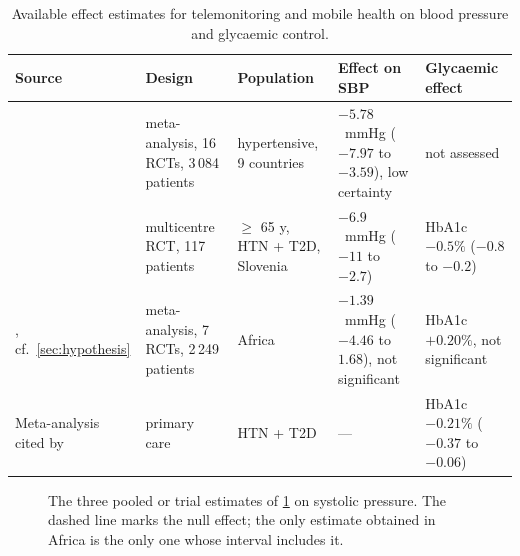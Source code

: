 \documentclass[12pt,a4paper,oneside]{report}
\begin{document}
\begin{table}[htbp]
\centering\footnotesize
\caption{Available effect estimates for telemonitoring and mobile health on blood pressure and glycaemic control.}\label{tab:effect-synthesis}
\begin{tabularx}{\textwidth}{@{}>{\raggedright\arraybackslash}p{2.3cm} >{\raggedright\arraybackslash}p{2.6cm} >{\raggedright\arraybackslash}p{2.4cm} >{\raggedright\arraybackslash}X >{\raggedright\arraybackslash}p{2.4cm}@{}}
\toprule
\textbf{Source} & \textbf{Design} & \textbf{Population} & \textbf{Effect on SBP} & \textbf{Glycaemic effect} \\
\midrule
\textcite{zhou2024} & meta-analysis, 16 RCTs, 3\,084 patients & hypertensive, 9 countries & $-5.78$~mmHg ($-7.97$ to $-3.59$), low certainty & not assessed \\
\textcite{mihevc2025} & multicentre RCT, 117 patients & $\geq$ 65 y, HTN + T2D, Slovenia & $-6.9$~mmHg ($-11$ to $-2.7$) & HbA1c $-0.5\%$ ($-0.8$ to $-0.2$) \\
\textcite{aovare2023}, cf.\ \cref{sec:hypothesis} & meta-analysis, 7 RCTs, 2\,249 patients & Africa & $-1.39$~mmHg ($-4.46$ to $1.68$), not significant & HbA1c $+0.20\%$, not significant \\
Meta-analysis cited by \textcite{mihevc2025} & primary care & HTN + T2D & --- & HbA1c $-0.21\%$ ($-0.37$ to $-0.06$) \\
\bottomrule
\end{tabularx}
\end{table}

\begin{figure}[htbp]
\centering
{}
\caption{The three pooled or trial estimates of \cref{tab:effect-synthesis} on systolic pressure. The dashed line marks the null effect; the only estimate obtained in Africa is the only one whose interval includes it.}\label{fig:effect-synthesis}
\end{figure}
\end{document}

